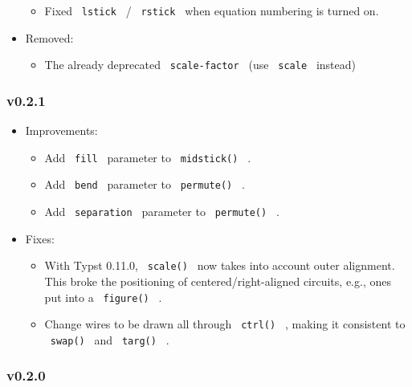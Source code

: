 \begin{itemize}
  \begin{itemize}
  \tightlist
  \item
    Fixed \texttt{\ lstick\ } / \texttt{\ rstick\ } when equation
    numbering is turned on.
  \end{itemize}
\item
  Removed:

  \begin{itemize}
  \tightlist
  \item
    The already deprecated \texttt{\ scale-factor\ } (use
    \texttt{\ scale\ } instead)
  \end{itemize}
\end{itemize}

\subsubsection{v0.2.1}\label{v0.2.1}

\begin{itemize}
\tightlist
\item
  Improvements:

  \begin{itemize}
  \tightlist
  \item
    Add \texttt{\ fill\ } parameter to \texttt{\ midstick()\ } .
  \item
    Add \texttt{\ bend\ } parameter to \texttt{\ permute()\ } .
  \item
    Add \texttt{\ separation\ } parameter to \texttt{\ permute()\ } .
  \end{itemize}
\item
  Fixes:

  \begin{itemize}
  \tightlist
  \item
    With Typst 0.11.0, \texttt{\ scale()\ } now takes into account outer
    alignment. This broke the positioning of centered/right-aligned
    circuits, e.g., ones put into a \texttt{\ figure()\ } .
  \item
    Change wires to be drawn all through \texttt{\ ctrl()\ } , making it
    consistent to \texttt{\ swap()\ } and \texttt{\ targ()\ } .
  \end{itemize}
\end{itemize}

\subsubsection{v0.2.0}\label{v0.2.0}

